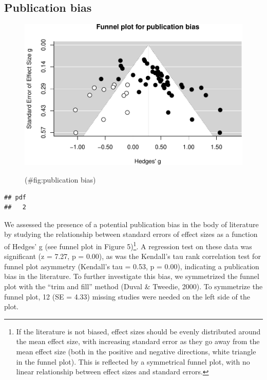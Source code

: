 \documentclass[man]{apa6}
\let\rmarkdownfootnote\footnote%
\def\footnote{\protect\rmarkdownfootnote}
\begin{document}
\subsection{Publication bias}\label{publication-bias}

\begin{figure}

{\centering \includegraphics{MA_speech_pref_files/figure-latex/publication bias-1} 

}

\caption{ }(\#fig:publication bias)
\end{figure}

\begin{verbatim}
## pdf 
##   2
\end{verbatim}

We assessed the presence of a potential publication bias in the body of
literature by studying the relationship between standard errors of
effect sizes as a function of Hedges' g (see funnel plot in Figure
5)\footnote{If the literature is not biased, effect sizes should be
  evenly distributed around the mean effect size, with increasing
  standard error as they go away from the mean effect size (both in the
  positive and negative directions, white triangle in the funnel plot).
  This is reflected by a symmetrical funnel plot, with no linear
  relationship between effect sizes and standard errors.}. A regression
test on these data was significant (z = 7.27, p = 0.00), as was the
Kendall's tau rank correlation test for funnel plot asymmetry (Kendall's
tau = 0.53, p = 0.00), indicating a publication bias in the literature.
To further investigate this bias, we symmetrized the funnel plot with
the \enquote{trim and fill} method (Duval \& Tweedie, 2000). To
symmetrize the funnel plot, 12 (SE = 4.33) missing studies were needed
on the left side of the plot.
\end{document}
